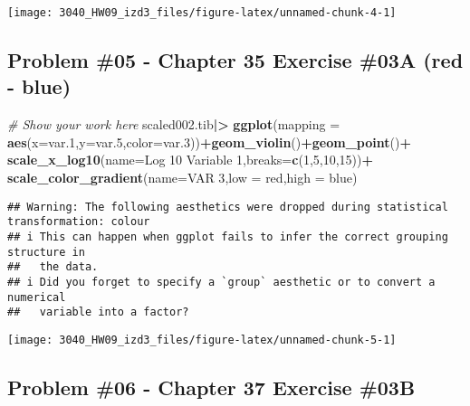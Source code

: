 \documentclass[
]{article}
\newenvironment{Shaded}{\begin{snugshade}}{\end{snugshade}}
\newcommand{\AttributeTok}[1]{\textcolor[rgb]{0.13,0.29,0.53}{#1}}
\newcommand{\CommentTok}[1]{\textcolor[rgb]{0.56,0.35,0.01}{\textit{#1}}}
\newcommand{\DecValTok}[1]{\textcolor[rgb]{0.00,0.00,0.81}{#1}}
\newcommand{\FloatTok}[1]{\textcolor[rgb]{0.00,0.00,0.81}{#1}}
\newcommand{\FunctionTok}[1]{\textcolor[rgb]{0.13,0.29,0.53}{\textbf{#1}}}
\newcommand{\NormalTok}[1]{#1}
\newcommand{\SpecialCharTok}[1]{\textcolor[rgb]{0.81,0.36,0.00}{\textbf{#1}}}
\newcommand{\StringTok}[1]{\textcolor[rgb]{0.31,0.60,0.02}{#1}}
\begin{document}
\texttt{[image: 3040\_HW09\_izd3\_files/figure-latex/unnamed-chunk-4-1]}

\newpage

\hypertarget{problem-05---chapter-35-exercise-03a-red---blue}{%
\subsection{Problem \#05 - Chapter 35 Exercise \#03A (red -
blue)}\label{problem-05---chapter-35-exercise-03a-red---blue}}

\begin{Shaded}
\begin{Highlighting}[]
\CommentTok{\# Show your work here}
\NormalTok{scaled002.tib}\SpecialCharTok{|\textgreater{}}
  \FunctionTok{ggplot}\NormalTok{(}\AttributeTok{mapping =} \FunctionTok{aes}\NormalTok{(}\AttributeTok{x=}\NormalTok{var}\FloatTok{.1}\NormalTok{,}\AttributeTok{y=}\NormalTok{var}\FloatTok{.5}\NormalTok{,}\AttributeTok{color=}\NormalTok{var}\FloatTok{.3}\NormalTok{))}\SpecialCharTok{+}\FunctionTok{geom\_violin}\NormalTok{()}\SpecialCharTok{+}\FunctionTok{geom\_point}\NormalTok{()}\SpecialCharTok{+}
  \FunctionTok{scale\_x\_log10}\NormalTok{(}\AttributeTok{name=}\StringTok{\textquotesingle{}Log 10 Variable 1\textquotesingle{}}\NormalTok{,}\AttributeTok{breaks=}\FunctionTok{c}\NormalTok{(}\DecValTok{1}\NormalTok{,}\DecValTok{5}\NormalTok{,}\DecValTok{10}\NormalTok{,}\DecValTok{15}\NormalTok{))}\SpecialCharTok{+}
  \FunctionTok{scale\_color\_gradient}\NormalTok{(}\AttributeTok{name=}\StringTok{\textquotesingle{}VAR 3\textquotesingle{}}\NormalTok{,}\AttributeTok{low =} \StringTok{\textquotesingle{}red\textquotesingle{}}\NormalTok{,}\AttributeTok{high =} \StringTok{\textquotesingle{}blue\textquotesingle{}}\NormalTok{)}
\end{Highlighting}
\end{Shaded}

\begin{verbatim}
## Warning: The following aesthetics were dropped during statistical transformation: colour
## i This can happen when ggplot fails to infer the correct grouping structure in
##   the data.
## i Did you forget to specify a `group` aesthetic or to convert a numerical
##   variable into a factor?
\end{verbatim}

\texttt{[image: 3040\_HW09\_izd3\_files/figure-latex/unnamed-chunk-5-1]}

\newpage

\hypertarget{problem-06---chapter-37-exercise-03b}{%
\subsection{Problem \#06 - Chapter 37 Exercise
\#03B}\label{problem-06---chapter-37-exercise-03b}}
\end{document}
